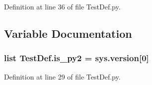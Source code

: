 Definition at line 36 of file Test\-Def.\-py.



\subsection{Variable Documentation}
\hypertarget{namespace_test_def_a4e87724b7a6a117c2cca22c557936868}{
\subsubsection[{is\-\_\-py2}]{\setlength{\rightskip}{0pt plus 5cm}list Test\-Def.\-is\-\_\-py2 = sys.\-version\mbox{[}0\mbox{]}}}\label{namespace_test_def_a4e87724b7a6a117c2cca22c557936868}


Definition at line 29 of file Test\-Def.\-py.

